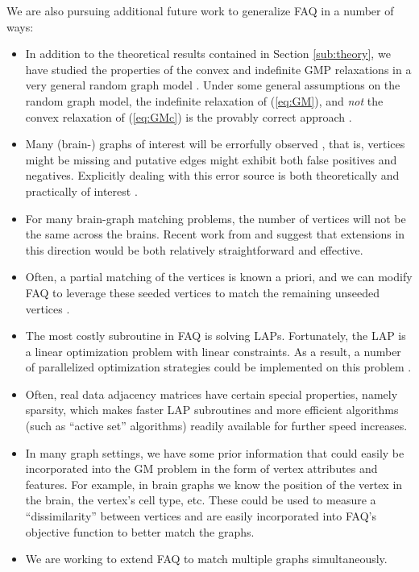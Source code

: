 \documentclass[10pt]{article}
\begin{document}


We are also pursuing additional future work to generalize FAQ in a number of ways:  
\begin{itemize}
\item In addition to the theoretical results contained in Section \ref{sub:theory}, we have studied the properties of the convex and indefinite GMP relaxations in a very general random graph model \cite{lyzinski2014graph}.  
Under some general assumptions on the random graph model, the indefinite relaxation of (\ref{eq:GM}), and {\it not} the convex relaxation of (\ref{eq:GMc}) is the provably correct approach \cite{lyzinski2014graph}.
\item Many (brain-) graphs of interest will be errorfully observed \cite{Priebe2011}, that is, vertices might be missing and putative edges might exhibit both false positives and negatives.  Explicitly dealing with this error source is both theoretically and practically of interest \cite{VP11_unlabeled}.  
\item For many brain-graph matching problems, the number of vertices will not be the same across the brains.  Recent work from \cite{Zaslavskiy2009, Zaslavskiy2010} and \cite{Escolano2011} suggest that extensions in this direction would be both relatively straightforward and effective. 
\item Often, a partial matching of the vertices is known a priori, and we can modify FAQ to leverage these seeded vertices to match the remaining unseeded vertices \cite{sgm2}.
\item The most costly subroutine in FAQ is solving LAPs.  Fortunately, the LAP is a linear optimization problem with linear constraints.  As a result, a number of parallelized optimization strategies could be implemented on this problem \cite{Boyd04a}. 
\item Often, real data adjacency matrices have certain special properties, namely sparsity, which makes faster LAP subroutines \cite{Jonker1987} and more efficient algorithms (such as ``active set'' algorithms) readily available for further speed increases.
\item In many graph settings, we have some prior information that could easily be incorporated into the GM problem in the form of vertex attributes and features.  For example, in brain graphs we know the position of the vertex in the brain, the vertex's cell type, etc.  These could be used to measure a ``dissimilarity'' between vertices and are easily incorporated into FAQ's objective function to better match the graphs.  
\item We are working to extend FAQ to match multiple graphs simultaneously.
\end{itemize}
\end{document}
